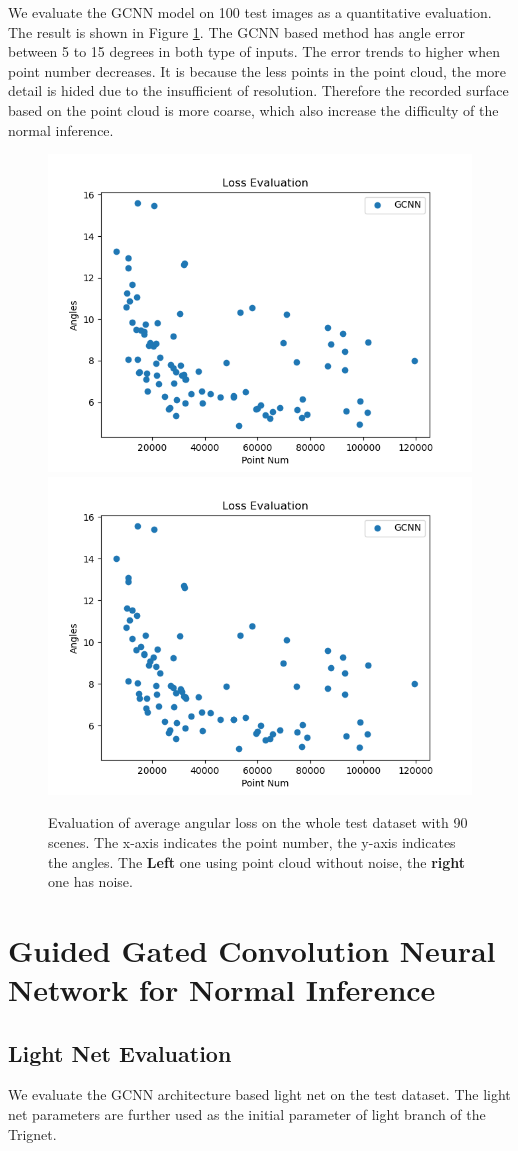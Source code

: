 \documentclass[border=15pt, multi, tikz]{article}
\begin{document}
We evaluate the GCNN model on 100 test images as a quantitative evaluation. The result is shown in Figure \ref{fig:scatter-gcnn}. The GCNN based method has angle error between 5 to 15 degrees in both type of inputs. The error trends to higher when point number decreases. It is because the less points in the point cloud, the more detail is hided due to the insufficient of resolution. Therefore the recorded surface based on the point cloud is more coarse, which also increase the difficulty of the normal inference.

\begin{figure}[h!]
	\centering
	\includegraphics[width=.4\textwidth]{./Figures/scatter-gcnn-no-noise.png}
	\includegraphics[width=.4\textwidth]{./Figures/scatter-gcnn-noised.png}
	\caption{Evaluation of average angular loss on the whole test dataset with 90 scenes. The x-axis indicates the point number, the y-axis indicates the angles. The \textbf{Left} one using point cloud without noise, the \textbf{right} one has noise.}
	\label{fig:scatter-gcnn}
\end{figure}


\newpage
\section{Guided Gated Convolution Neural Network for Normal Inference }

\subsection{Light Net Evaluation}

We evaluate the GCNN architecture based light net on the test dataset. The light net parameters are further used as the initial parameter of light branch of the Trignet.
\end{document}

